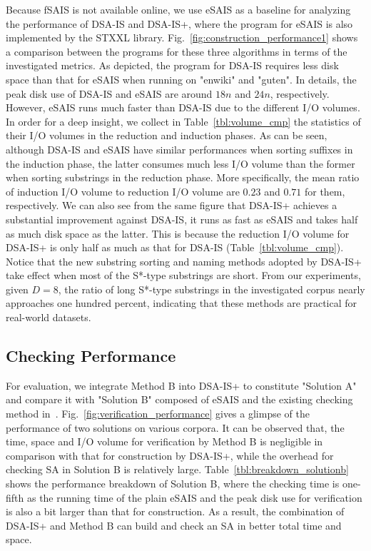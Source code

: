 \documentclass[10pt,journal,compsoc]{IEEEtran}
\begin{document}
Because fSAIS is not available online, we use eSAIS as a baseline for analyzing the performance of DSA-IS and DSA-IS+, where the program for eSAIS is also implemented by the STXXL library. Fig.~\ref{fig:construction_performance1} shows a comparison between the programs for these three algorithms in terms of the investigated metrics. As depicted, the program for DSA-IS requires less disk space than that for eSAIS when running on "enwiki" and "guten". In details, the peak disk use of DSA-IS and eSAIS are around $18n$ and $24n$, respectively. However, eSAIS runs much faster than DSA-IS due to the different I/O volumes. In order for a deep insight, we collect in Table~\ref{tbl:volume_cmp} the statistics of their I/O volumes in the reduction and induction phases. As can be seen, although DSA-IS and eSAIS have similar performances when sorting suffixes in the induction phase, the latter consumes much less I/O volume than the former when sorting substrings in the reduction phase. More specifically, the mean ratio of induction I/O volume to reduction I/O volume are $0.23$ and $0.71$ for them, respectively. We can also see from the same figure that DSA-IS+ achieves a substantial improvement against DSA-IS, it runs as fast as eSAIS and takes half as much disk space as the latter. This is because the reduction I/O volume for DSA-IS+ is only half as much as that for DSA-IS (Table~\ref{tbl:volume_cmp}). Notice that the new substring sorting and naming methods adopted by DSA-IS+ take effect when most of the S*-type substrings are short. From our experiments, given $D = 8$, the ratio of long S*-type substrings in the investigated corpus nearly approaches one hundred percent, indicating that these methods are practical for real-world datasets.

\subsection{Checking Performance}

For evaluation, we integrate Method B into DSA-IS+ to constitute "Solution A" and compare it with "Solution B" composed of eSAIS and the existing checking method in~\cite{Dementiev2008a}. Fig.~\ref{fig:verification_performance} gives a glimpse of the performance of two solutions on various corpora. It can be observed that, the time, space and I/O volume for verification by Method B is negligible in comparison with that for construction by DSA-IS+, while the overhead for checking SA in Solution B is relatively large. Table~\ref{tbl:breakdown_solutionb} shows the performance breakdown of Solution B, where the checking time is one-fifth as the running time of the plain eSAIS and the peak disk use for verification is also a bit larger than that for construction. As a result, the combination of DSA-IS+ and Method B can build and check an SA in better total time and space.
\end{document}

